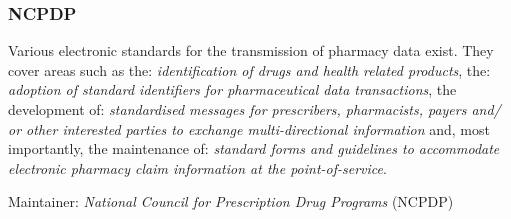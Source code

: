 %
%
%
%
%
%
%

\subsubsection{NCPDP}
\label{ncpdp_heading}

Various electronic standards for the transmission of pharmacy data exist. They
cover areas such as the: \textit{identification of drugs and health related
products}, the: \textit{adoption of standard identifiers for pharmaceutical
data transactions}, the development of: \textit{standardised messages for
prescribers, pharmacists, payers and/ or other interested parties to exchange
multi-directional information} and, most importantly, the maintenance of:
\textit{standard forms and guidelines to accommodate electronic pharmacy claim
information at the point-of-service}. \cite{ncpdp}

Maintainer: \emph{National Council for Prescription Drug Programs} (NCPDP)
